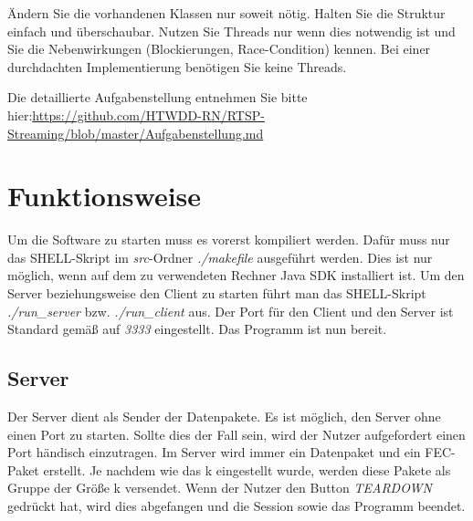 Ändern Sie die vorhandenen Klassen nur soweit nötig. Halten Sie die Struktur einfach und überschaubar. Nutzen Sie Threads nur wenn dies notwendig ist und Sie die Nebenwirkungen (Blockierungen, Race-Condition) kennen. Bei einer durchdachten Implementierung benötigen Sie keine Threads.

\ret
Die detaillierte Aufgabenstellung entnehmen Sie bitte hier:\ret \url{https://github.com/HTWDD-RN/RTSP-Streaming/blob/master/Aufgabenstellung.md}

\section{Funktionsweise}
Um die Software zu starten muss es vorerst kompiliert werden. Dafür muss nur das SHELL-Skript im \textit{src}-Ordner \textit{./makefile} ausgeführt werden. Dies ist nur möglich, wenn auf dem zu verwendeten Rechner Java SDK installiert ist.\ret
Um den Server beziehungsweise den Client zu starten führt man das SHELL-Skript \textit{./run\_server} bzw. \textit{./run\_client} aus. Der Port für den Client und den Server ist Standard gemäß auf \textit{3333} eingestellt. Das Programm ist nun bereit.
\subsection{Server}
Der Server dient als Sender der Datenpakete. Es ist möglich, den Server ohne einen Port zu starten. Sollte dies der Fall sein, wird der Nutzer aufgefordert einen Port händisch einzutragen. \ret
Im Server wird immer ein Datenpaket und ein FEC-Paket erstellt. Je nachdem wie das k eingestellt wurde, werden diese Pakete als Gruppe der Größe k versendet. \ret
Wenn der Nutzer den Button \textit{TEARDOWN} gedrückt hat, wird dies abgefangen und die Session sowie das Programm beendet.


